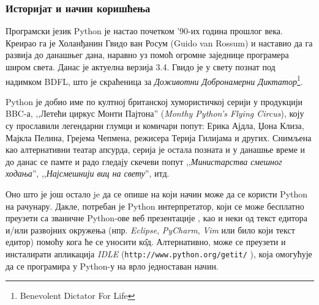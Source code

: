 \subsubsection{Историјат и начин коришћења}
Програмски језик Python је настао почетком '90-их година прошлог века. Креирао га је Холанђанин Гвидо ван Росум (Guido van Rossum) и наставио да га развија до данашњег дана, наравно уз помоћ огромне заједнице програмера широм света. Данас је актуелна верзија 3.4. Гвидо је у свету познат под надимком BDFL, што је скраћеница за \emph{Доживотни Добронамерни Диктатор}\footnote{Benevolent Dictator For Life}.

Python је добио име по култној британској хумористичкој серији у продукцији BBC-а, ,,Летећи циркус Монти Пајтона'' (\emph{Monthy Python's Flying Circus}), коју су прославили легендарни глумци и комичари попут: Ерика Ајдла, Џона Клиза, Мајкла Пелина, Грејема Чепмена, режисера Терија Гилијама и других. Снимљена као алтернативни театар апсурда, серија је остала позната и у данашње време и до данас се памте и радо гледају скечеви попут ,,\emph{Министарства смешног ходања}'', ,,\emph{Најсмешнији виц на свету}'', итд.

Оно што је још остало je да се опише на који начин може да се користи Python на рачунару. Дакле, потребан је Python интерпретатор, који се може бесплатно преузети са званичне Python-ове веб презентације \cite{pythonsite}, као и неки од текст едитора и/или развојних окружења (нпр. \emph{Eclipse}, \emph{PyCharm}, \emph{Vim} или било који текст едитор) помоћу кога ће се уносити к\^{о}д. Алтернативно, може се преузети и инсталирати апликација \emph{IDLE} (\texttt{http://www.python.org/getit/} ), која омогућује да се програмира у Python-у на врло једноставан начин.

